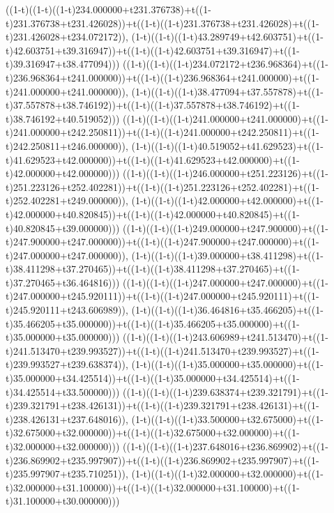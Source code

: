 ((1-t)((1-t)((1-t)234.000000+t231.376738)+t((1-t)231.376738+t231.426028))+t((1-t)((1-t)231.376738+t231.426028)+t((1-t)231.426028+t234.072172)),                                     (1-t)((1-t)((1-t)43.289749+t42.603751)+t((1-t)42.603751+t39.316947))+t((1-t)((1-t)42.603751+t39.316947)+t((1-t)39.316947+t38.477094)))
((1-t)((1-t)((1-t)234.072172+t236.968364)+t((1-t)236.968364+t241.000000))+t((1-t)((1-t)236.968364+t241.000000)+t((1-t)241.000000+t241.000000)),                                     (1-t)((1-t)((1-t)38.477094+t37.557878)+t((1-t)37.557878+t38.746192))+t((1-t)((1-t)37.557878+t38.746192)+t((1-t)38.746192+t40.519052)))
((1-t)((1-t)((1-t)241.000000+t241.000000)+t((1-t)241.000000+t242.250811))+t((1-t)((1-t)241.000000+t242.250811)+t((1-t)242.250811+t246.000000)),                                     (1-t)((1-t)((1-t)40.519052+t41.629523)+t((1-t)41.629523+t42.000000))+t((1-t)((1-t)41.629523+t42.000000)+t((1-t)42.000000+t42.000000)))
((1-t)((1-t)((1-t)246.000000+t251.223126)+t((1-t)251.223126+t252.402281))+t((1-t)((1-t)251.223126+t252.402281)+t((1-t)252.402281+t249.000000)),                                     (1-t)((1-t)((1-t)42.000000+t42.000000)+t((1-t)42.000000+t40.820845))+t((1-t)((1-t)42.000000+t40.820845)+t((1-t)40.820845+t39.000000)))
((1-t)((1-t)((1-t)249.000000+t247.900000)+t((1-t)247.900000+t247.000000))+t((1-t)((1-t)247.900000+t247.000000)+t((1-t)247.000000+t247.000000)),                                     (1-t)((1-t)((1-t)39.000000+t38.411298)+t((1-t)38.411298+t37.270465))+t((1-t)((1-t)38.411298+t37.270465)+t((1-t)37.270465+t36.464816)))
((1-t)((1-t)((1-t)247.000000+t247.000000)+t((1-t)247.000000+t245.920111))+t((1-t)((1-t)247.000000+t245.920111)+t((1-t)245.920111+t243.606989)),                                     (1-t)((1-t)((1-t)36.464816+t35.466205)+t((1-t)35.466205+t35.000000))+t((1-t)((1-t)35.466205+t35.000000)+t((1-t)35.000000+t35.000000)))
((1-t)((1-t)((1-t)243.606989+t241.513470)+t((1-t)241.513470+t239.993527))+t((1-t)((1-t)241.513470+t239.993527)+t((1-t)239.993527+t239.638374)),                                     (1-t)((1-t)((1-t)35.000000+t35.000000)+t((1-t)35.000000+t34.425514))+t((1-t)((1-t)35.000000+t34.425514)+t((1-t)34.425514+t33.500000)))
((1-t)((1-t)((1-t)239.638374+t239.321791)+t((1-t)239.321791+t238.426131))+t((1-t)((1-t)239.321791+t238.426131)+t((1-t)238.426131+t237.648016)),                                     (1-t)((1-t)((1-t)33.500000+t32.675000)+t((1-t)32.675000+t32.000000))+t((1-t)((1-t)32.675000+t32.000000)+t((1-t)32.000000+t32.000000)))
((1-t)((1-t)((1-t)237.648016+t236.869902)+t((1-t)236.869902+t235.997907))+t((1-t)((1-t)236.869902+t235.997907)+t((1-t)235.997907+t235.710251)),                                     (1-t)((1-t)((1-t)32.000000+t32.000000)+t((1-t)32.000000+t31.100000))+t((1-t)((1-t)32.000000+t31.100000)+t((1-t)31.100000+t30.000000)))
